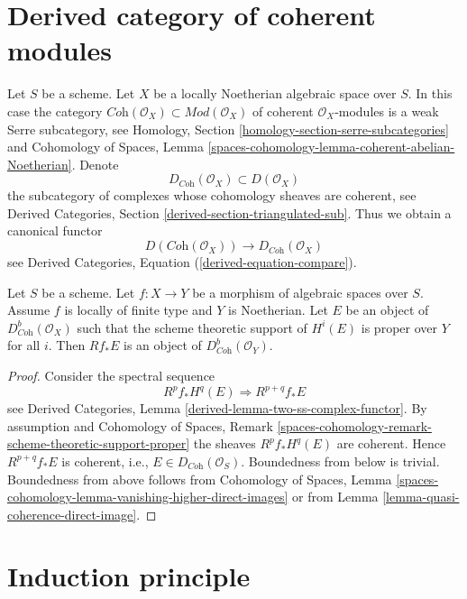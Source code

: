 \section{Derived category of coherent modules}
\label{section-derived-coherent}

\noindent
Let $S$ be a scheme. Let $X$ be a locally Noetherian algebraic space over $S$.
In this case the category
$\textit{Coh}(\mathcal{O}_X) \subset \textit{Mod}(\mathcal{O}_X)$
of coherent $\mathcal{O}_X$-modules is a weak Serre subcategory, see
Homology, Section \ref{homology-section-serre-subcategories}
and
Cohomology of Spaces, Lemma
\ref{spaces-cohomology-lemma-coherent-abelian-Noetherian}.
Denote
$$
D_{\textit{Coh}}(\mathcal{O}_X) \subset D(\mathcal{O}_X)
$$
the subcategory of complexes whose cohomology sheaves are coherent, see
Derived Categories, Section \ref{derived-section-triangulated-sub}.
Thus we obtain a canonical functor
\begin{equation}
\label{equation-compare-coherent}
D(\textit{Coh}(\mathcal{O}_X))
\longrightarrow
D_{\textit{Coh}}(\mathcal{O}_X)
\end{equation}
see Derived Categories, Equation (\ref{derived-equation-compare}).

\begin{lemma}
\label{lemma-direct-image-coherent}
Let $S$ be a scheme. Let $f : X \to Y$ be a morphism of algebraic spaces
over $S$. Assume $f$ is locally of finite type and $Y$ is Noetherian.
Let $E$ be an object of $D^b_{\textit{Coh}}(\mathcal{O}_X)$ such that the
scheme theoretic support of $H^i(E)$ is proper over $Y$ for all $i$.
Then $Rf_*E$ is an object of $D^b_{\textit{Coh}}(\mathcal{O}_Y)$.
\end{lemma}

\begin{proof}
Consider the spectral sequence
$$
R^pf_*H^q(E) \Rightarrow R^{p + q}f_*E
$$
see Derived Categories, Lemma \ref{derived-lemma-two-ss-complex-functor}.
By assumption and
Cohomology of Spaces, Remark
\ref{spaces-cohomology-remark-scheme-theoretic-support-proper}
the sheaves $R^pf_*H^q(E)$ are coherent. Hence
$R^{p + q}f_*E$ is coherent, i.e., $E \in D_{\textit{Coh}}(\mathcal{O}_S)$.
Boundedness from below is trivial. Boundedness from above
follows from
Cohomology of Spaces, Lemma
\ref{spaces-cohomology-lemma-vanishing-higher-direct-images}
or from
Lemma \ref{lemma-quasi-coherence-direct-image}.
\end{proof}




\section{Induction principle}
\label{section-induction}

